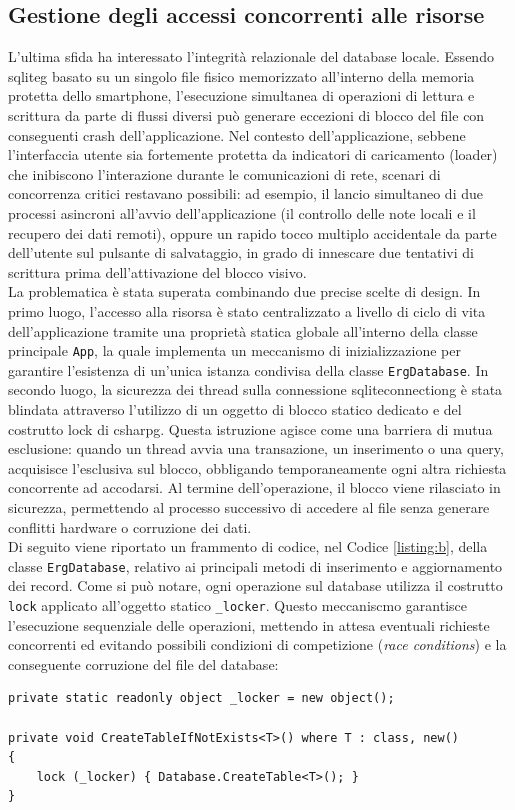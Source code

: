 \subsection*{Gestione degli accessi concorrenti alle risorse}
\noindent L'ultima sfida ha interessato l'integrità relazionale del database locale. Essendo \gls{sqliteg} basato su un singolo file fisico memorizzato all'interno della memoria protetta dello smartphone, l'esecuzione simultanea di operazioni di lettura e scrittura da parte di flussi diversi può generare eccezioni di blocco del file con conseguenti crash dell'applicazione. Nel contesto dell'applicazione, sebbene l'interfaccia utente sia fortemente protetta da indicatori di caricamento (loader) che inibiscono l'interazione durante le comunicazioni di rete, scenari di concorrenza critici restavano possibili: ad esempio, il lancio simultaneo di due processi asincroni all'avvio dell'applicazione (il controllo delle note locali e il recupero dei dati remoti), oppure un rapido tocco multiplo accidentale da parte dell'utente sul pulsante di salvataggio, in grado di innescare due tentativi di scrittura prima dell'attivazione del blocco visivo.\\
La problematica è stata superata combinando due precise scelte di design. In primo luogo, l'accesso alla risorsa è stato centralizzato a livello di ciclo di vita dell'applicazione tramite una proprietà statica globale all'interno della classe principale \texttt{App}, la quale implementa un meccanismo di inizializzazione per garantire l'esistenza di un'unica istanza condivisa della classe \texttt{ErgDatabase}. In secondo luogo, la sicurezza dei thread sulla connessione \gls{sqliteconnectiong} è stata blindata attraverso l'utilizzo di un oggetto di blocco statico dedicato e del costrutto lock di \gls{csharpg}. Questa istruzione agisce come una barriera di mutua esclusione: quando un thread avvia una transazione, un inserimento o una query, acquisisce l'esclusiva sul blocco, obbligando temporaneamente ogni altra richiesta concorrente ad accodarsi. Al termine dell'operazione, il blocco viene rilasciato in sicurezza, permettendo al processo successivo di accedere al file senza generare conflitti hardware o corruzione dei dati. \\
Di seguito viene riportato un frammento di codice, nel Codice \ref{listing:b}, della classe \texttt{ErgDatabase}, relativo ai principali metodi di inserimento e aggiornamento dei record. Come si può notare, ogni operazione sul database utilizza il costrutto \texttt{lock} applicato all'oggetto statico \texttt{\_locker}. Questo meccaniscmo garantisce l'esecuzione sequenziale delle operazioni, mettendo in attesa eventuali richieste concorrenti ed evitando possibili condizioni di competizione (\textit{race conditions}) e la conseguente corruzione del file del database:
\begin{listing}[H]
\begin{verbatim}
private static readonly object _locker = new object();

private void CreateTableIfNotExists<T>() where T : class, new()
{
    lock (_locker) { Database.CreateTable<T>(); }
}
\end{verbatim}
\label{listing:a}
\end{listing}

